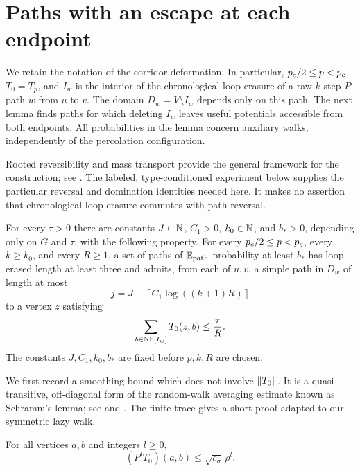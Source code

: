 \section{Paths with an escape at each endpoint}
\label{path:section}

We retain the notation of the corridor deformation. In particular,
${p_c}/2\le p<{p_c}$, $T_0=T_p$, and $I_w$ is the interior of the
chronological loop erasure of a raw $k$-step $P$-path $w$ from $u$ to $v$.
The domain $D_w=V\setminus I_w$ depends only on this path. The next lemma
finds paths for which deleting $I_w$ leaves useful potentials accessible
from both endpoints. All probabilities in the lemma concern auxiliary
walks, independently of the percolation configuration.

Rooted reversibility and mass transport provide the general framework
for the construction; see \cite[Theorem~4.1]{AldousLyons2007}.
The labeled, type-conditioned experiment below supplies the particular
reversal and domination identities needed here. It makes no assertion
that chronological loop erasure commutes with path reversal.

\begin{lemma}
\label{path:selection}
For every $\tau>0$ there are constants $J\in\mathbb N$, $C_1>0$, $k_0\in\mathbb N$,
and $b_*>0$, depending only on $G$ and $\tau$, with the following property.
For every ${p_c}/2\le p<{p_c}$, every $k\ge k_0$, and every $R\ge1$, a set
of paths of $\mathbb E_{\mathrm{path}}$-probability at least $b_*$ has
loop-erased length at least three and admits, from each of $u,v$, a
simple path in $D_w$ of length at most
\[
 j=J+\left\lceil C_1\log((k+1)R)\right\rceil
\]
to a vertex $z$ satisfying
\begin{equation}
 \sum_{b\in\operatorname{Nb}[I_w]}T_0(z,b)\le\frac{\tau}{R}.
 \label{eq:s33}
\end{equation}
The constants $J,C_1,k_0,b_*$ are fixed before $p,k,R$ are chosen.
\end{lemma}

We first record a smoothing bound which does not involve $\lVert T_0\rVert$.
It is a quasi-transitive, off-diagonal form of the random-walk averaging
estimate known as Schramm's lemma; see \cite[Section~1.1]{Kozma2011}
and \cite[Proposition~6.4]{Hutchcroft2019}. The finite trace gives a
short proof adapted to our symmetric lazy walk.

\begin{lemma}
\label{path:smoothing}
For all vertices $a,b$ and integers $l\ge0$,
\begin{equation}
 (P^lT_0)(a,b)\le\sqrt{c_\sigma}\,\rho^l.
 \label{eq:s34}
\end{equation}
\end{lemma}

